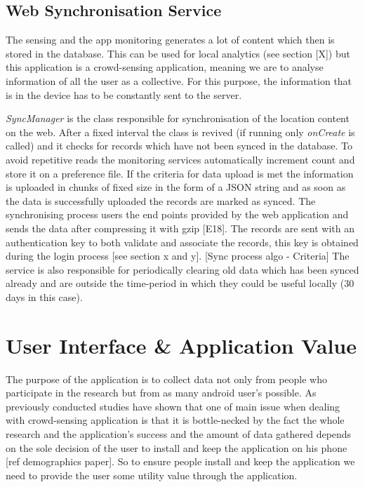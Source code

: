 \documentclass[12pt]{report}
\begin{document}
\subsection{Web Synchronisation Service}
The sensing and the app monitoring generates a lot of content which then is stored in the database. This can be used for local analytics (see section [X]) but this application is a crowd-sensing application, meaning we are to analyse information of all the user as a collective. For this purpose, the information that is in the device has to be constantly sent to the server.

\textit{SyncManager} is the class responsible for synchronisation of the location content on the web. After a fixed interval the class is revived (if running only \textit{onCreate} is called) and it checks for records which have not been synced in the database. To avoid repetitive reads the monitoring services automatically increment count and store it on a preference file. If the criteria for data upload is met the information is uploaded in chunks of fixed size in the form of a JSON string and as soon as the data is successfully uploaded the records are marked as synced. The synchronising process users the end points provided by the web application and sends the data after compressing it with gzip [E18]. The records are sent with an authentication key to both validate and associate the records, this key is obtained during the login process [see section x and y].
[Sync process algo - Criteria]
The service is also responsible for periodically clearing old data which has been synced already and are outside the time-period in which they could be useful locally (30 days in this case).

\section{User Interface \& Application Value}
The purpose of the application is to collect data not only from people who participate in the research but from as many android user's possible. As previously conducted studies have shown that one of main issue when dealing with crowd-sensing application is that it is bottle-necked by the fact the whole research and the application's success and the amount of data gathered depends on the sole decision of the user to install and keep the application on his phone [ref demographics paper]. So to ensure people install and keep the application we need to provide the user some utility value through the application.
\end{document}

